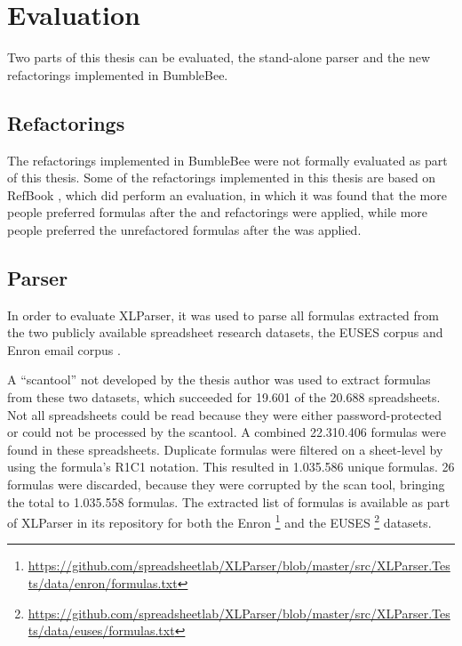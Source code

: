 
\chapter{Evaluation}
\label{chapter:evaluation}

Two parts of this thesis can be evaluated, the stand-alone parser and the new refactorings implemented in BumbleBee.

\section{Refactorings}

The refactorings implemented in BumbleBee were not formally evaluated as part of this thesis.
Some of the refactorings implemented in this thesis are based on RefBook \cite{badame2012refactoring}, which did perform an evaluation, in which it was found that the more people preferred formulas after the  and  refactorings were applied, while more people preferred the unrefactored formulas after the  was applied.

\section{Parser}

In order to evaluate XLParser, it was used to parse all formulas extracted from the two publicly available spreadsheet research datasets, the EUSES corpus \cite{fisher2005euses} and Enron email corpus \cite{klimt2004enron, hermans2015enron}.

A ``scantool'' not developed by the thesis author was used to extract formulas from these two datasets, which succeeded for 19.601 of the 20.688 spreadsheets.
Not all spreadsheets could be read because they were either password-protected or could not be processed by the scantool.
A combined 22.310.406 formulas were found in these spreadsheets.
Duplicate formulas were filtered on a sheet-level by using the formula's R1C1 notation.
This resulted in 1.035.586 unique formulas.
26 formulas were discarded, because they were corrupted by the scan tool, bringing the total to 1.035.558 formulas.
The extracted list of formulas is available as part of XLParser in its repository for both the Enron \footnote{\url{https://github.com/spreadsheetlab/XLParser/blob/master/src/XLParser.Tests/data/enron/formulas.txt}} and the EUSES \footnote{\url{https://github.com/spreadsheetlab/XLParser/blob/master/src/XLParser.Tests/data/euses/formulas.txt}} datasets.

